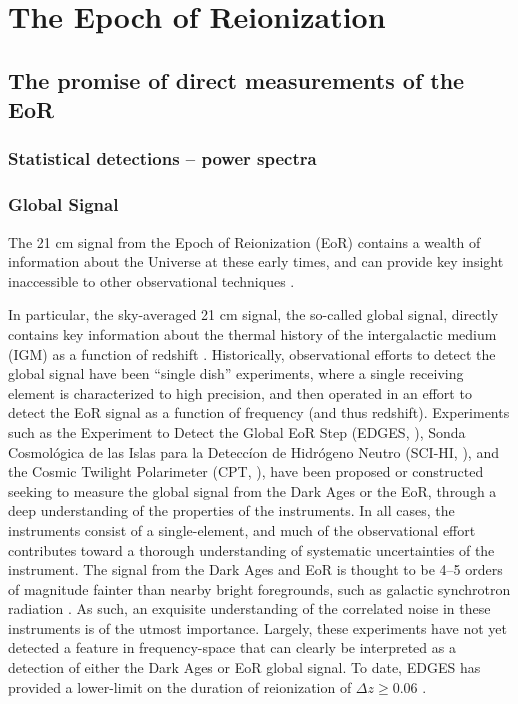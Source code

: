 \chapter{The Epoch of Reionization}
\label{chapter:eor_intro}


\section{The promise of direct measurements of the EoR}


\subsection{Statistical detections -- power spectra}


\subsection{Global Signal}

The 21 cm signal from the Epoch of Reionization (EoR) contains a wealth of
information about the Universe at these early times, and can provide key insight
inaccessible to other observational techniques \citep{Loeb.12}. 

In particular, the sky-averaged 21 cm signal, the so-called global signal, directly
contains key information about the thermal history of the intergalactic medium
(IGM) as a function of redshift \citep{Pritchard.10}. Historically,
observational efforts to detect the global signal have been ``single dish''
experiments, where a single receiving element is characterized to high
precision, and then operated in an effort to detect the EoR signal as a function
of frequency (and thus redshift). Experiments such as the Experiment to Detect
the Global EoR Step (EDGES, \citealt{Bowman.10}), Sonda Cosmol\'{o}gica
de las Islas para la Detecc\'{i}on de Hidr\'{o}geno Neutro (SCI-HI,
\citealt{Voytek.14}), and the Cosmic Twilight Polarimeter (CPT,
\citealt{Nhan.16}), have been proposed or constructed seeking to measure
the global signal from the Dark Ages or the EoR, through a deep understanding of
the properties of the instruments. In all cases, the instruments consist of a
single-element, and much of the observational effort contributes toward a
thorough understanding of systematic uncertainties of the instrument. The signal
from the Dark Ages and EoR is thought to be 4--5 orders of magnitude fainter
than nearby bright foregrounds, such as galactic synchrotron radiation
\citep{McQuinn.07}. As such, an exquisite understanding of the correlated
noise in these instruments is of the utmost importance. Largely, these
experiments have not yet detected a feature in frequency-space that can clearly
be interpreted as a detection of either the Dark Ages or EoR global signal. To
date, EDGES has provided a lower-limit on the duration of reionization of
$\Delta z \geq 0.06$ \citep{Bowman.10}.

